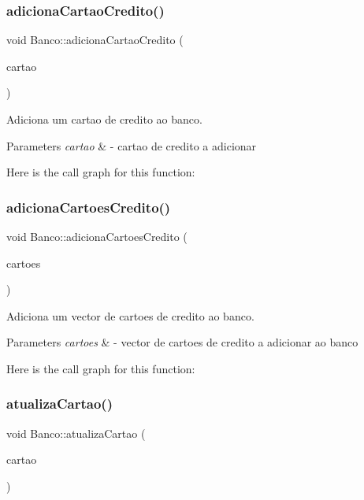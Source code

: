 \subsubsection{\texorpdfstring{adiciona\+Cartao\+Credito()}{adicionaCartaoCredito()}}
{\footnotesize\ttfamily void Banco\+::adiciona\+Cartao\+Credito (\begin{DoxyParamCaption}\item[{const \mbox{\hyperlink{class_cartao_credito}{Cartao\+Credito}} \&}]{cartao }\end{DoxyParamCaption})}



Adiciona um cartao de credito ao banco. 


\begin{DoxyParams}{Parameters}
{\em cartao} & -\/ cartao de credito a adicionar \\
\hline
\end{DoxyParams}
Here is the call graph for this function\+:
\mbox{\label{class_banco_a5f36ab07909fc570d158a21e2e6398f5}} 
\subsubsection{\texorpdfstring{adiciona\+Cartoes\+Credito()}{adicionaCartoesCredito()}}
{\footnotesize\ttfamily void Banco\+::adiciona\+Cartoes\+Credito (\begin{DoxyParamCaption}\item[{const std\+::vector$<$ \mbox{\hyperlink{class_cartao_credito}{Cartao\+Credito}} $>$ \&}]{cartoes }\end{DoxyParamCaption})}



Adiciona um vector de cartoes de credito ao banco. 


\begin{DoxyParams}{Parameters}
{\em cartoes} & -\/ vector de cartoes de credito a adicionar ao banco \\
\hline
\end{DoxyParams}
Here is the call graph for this function\+:
\mbox{\label{class_banco_a8c8f743903ba86129b62afbb3813e6f0}} 
\subsubsection{\texorpdfstring{atualiza\+Cartao()}{atualizaCartao()}}
{\footnotesize\ttfamily void Banco\+::atualiza\+Cartao (\begin{DoxyParamCaption}\item[{\mbox{\hyperlink{class_cartao_credito}{Cartao\+Credito}} \&}]{cartao }\end{DoxyParamCaption})}




